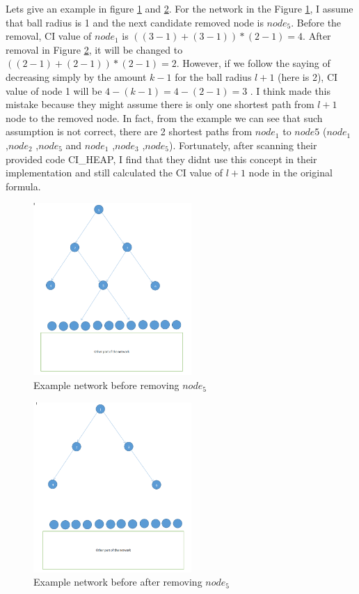 \documentclass{article}
\begin{document}
	

	Let\textquotesingle s give an example in figure \ref{fig:figure1} and \ref{fig:figure2}. For the network in the Figure \ref{fig:figure1}, I assume that ball radius is 1 and the next candidate removed node is $node_5$. Before the removal, CI value of $node_1$ is $((3-1)+(3-1))*(2-1)=4$. After removal in Figure \ref{fig:figure2}, it will be changed to $((2-1)+(2-1))*(2-1)=2$. However, if we follow the saying of decreasing simply by the amount $k − 1$ for the ball radius $l + 1$ (here is 2), CI value of node 1 will be $4-(k-1)=4-(2-1)=3$ . I think \cite{morone2016collective} made this mistake because they might assume there is only one shortest path from $l + 1$ node to the removed node. In fact, from the example we can see that such assumption is not correct, there are 2 shortest paths from $node_1$ to $node 5$ ($node_1$ ,$node_2$ ,$node_5$ and $node_1$ ,$node_3$ ,$node_5$). Fortunately, after scanning their provided code CI\_HEAP, I find that they didn\textquotesingle t use this concept in their implementation and still calculated the CI value of $l + 1$ node in the original formula.
	
	\begin{figure}[htp]
	\centering 
	\includegraphics[width = 6cm]{1.png}
	\caption{Example network before removing $node_5$  }
	\label{fig:figure1}
	\end{figure}
	
	\begin{figure}[htp]
	\centering 
	\includegraphics[width = 6cm]{2.png}
	\caption{Example network before after removing $node_5$  }
	\label{fig:figure2}
	\end{figure}	
	
\end{document}
